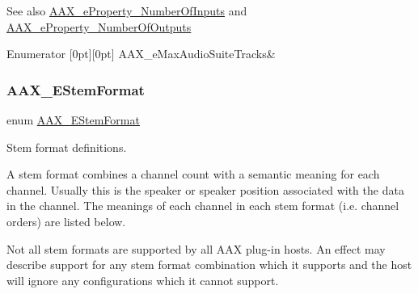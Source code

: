 \begin{DoxySeeAlso}{See also}
\mbox{\hyperlink{a00662_a13e384f22825afd3db6d68395b79ce0da00ed3da39077c52ef259f350837fc981}{A\+A\+X\+\_\+e\+Property\+\_\+\+Number\+Of\+Inputs}} and \mbox{\hyperlink{a00662_a13e384f22825afd3db6d68395b79ce0dab7e07d482d3b6e527fc13bbc9f4eaf63}{A\+A\+X\+\_\+e\+Property\+\_\+\+Number\+Of\+Outputs}} 
\end{DoxySeeAlso}
\begin{DoxyEnumFields}{Enumerator}
[0pt][0pt]{}\mbox{\label{a00491_af94bcc724bc9a54eb8a83a664c0b1b48ae17d0cdef833dd0574d2e6b155ef2f86}} 
A\+A\+X\+\_\+e\+Max\+Audio\+Suite\+Tracks&\\
\hline

\end{DoxyEnumFields}
\mbox{\label{a00491_ad8af5ef008b2bd478add9a0acb0a1d85}} 
\subsubsection{\texorpdfstring{AAX\_EStemFormat}{AAX\_EStemFormat}}
{\footnotesize\ttfamily enum \mbox{\hyperlink{a00491_ad8af5ef008b2bd478add9a0acb0a1d85}{A\+A\+X\+\_\+\+E\+Stem\+Format}}}



Stem format definitions. 

A stem format combines a channel count with a semantic meaning for each channel. Usually this is the speaker or speaker position associated with the data in the channel. The meanings of each channel in each stem format (i.\+e. channel orders) are listed below.

Not all stem formats are supported by all A\+AX plug-\/in hosts. An effect may describe support for any stem format combination which it supports and the host will ignore any configurations which it cannot support.

